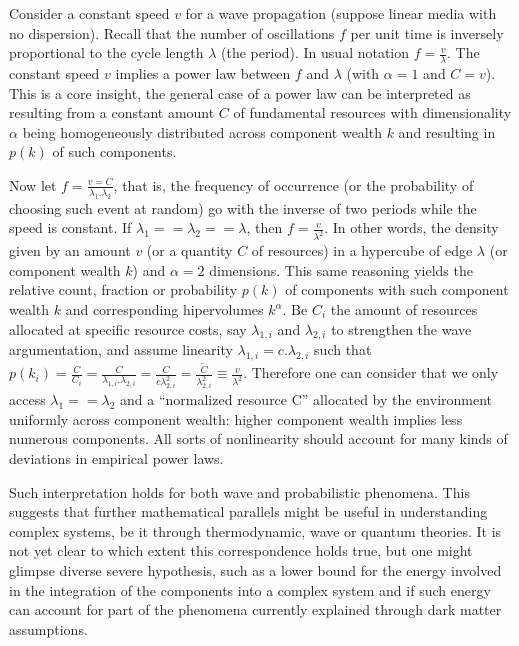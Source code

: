 \documentclass[a4paper, 11pt]{article} %
\begin{document}
Consider a constant speed $v$ for a wave propagation
(suppose linear media with no dispersion).
Recall that the number of oscillations $f$ per unit time is
inversely proportional to the cycle length $\lambda$ (the period).
In usual notation $f=\frac{v}{\lambda}$.
The constant speed $v$ implies a power law between 
$f$ and $\lambda$ (with $\alpha=1$ and $C=v$).
This is a core insight, the general case of a power law can
be interpreted as resulting from a constant amount $C$ of
fundamental resources with dimensionality $\alpha$ 
being homogeneously distributed across
component wealth $k$ and 
resulting in $p(k)$ of such components.

Now let $f=\frac{v=C}{\lambda_1 . \lambda_2}$, that is,
the frequency of occurrence
(or the probability of choosing such event at random) go with the inverse of two periods while the speed is constant. 
If $\lambda_1==\lambda_2==\lambda$, then $f=\frac{v}{\lambda^2}$.
In other words, the density given by an amount $v$
(or a quantity $C$ of resources) in a hypercube of
edge $\lambda$ (or component wealth $k$)
and $\alpha=2$ dimensions.
This same reasoning yields the relative count,
fraction or probability $p(k)$
of components with such component wealth $k$ and corresponding hipervolumes $k^\alpha$.
Be $C_i$ the amount of resources allocated at
specific resource costs,
say $\lambda_{1,i}$ and $\lambda_{2,i}$ to strengthen the wave argumentation,
and assume linearity $\lambda_{1,i}=c.\lambda_{2,i}$
such that
$p(k_i)=\frac{C}{C_i}=\frac{C}{\lambda_{1,i}.\lambda_{2,i}}=
\frac{C}{c\lambda_{2,i}^2}=\frac{\widetilde{C}}{\lambda_{2,i}^2}\equiv\frac{v}{\lambda^2}$.
Therefore one can consider that we only access $\lambda_1==\lambda_2$ and a ``normalized resource C'' allocated by the environment uniformly across component wealth:
higher component wealth implies less numerous components. 
All sorts of nonlinearity should account
for many kinds of deviations in empirical power laws.

Such interpretation holds for 
both wave and probabilistic phenomena.
This suggests that further mathematical
parallels might be useful in understanding complex
systems, be it through thermodynamic, wave or quantum theories.
It is not yet clear to which extent this correspondence holds true,
but one might glimpse diverse severe hypothesis,
such as a lower bound for the energy involved in the integration of
the components into a complex system and
if such energy can account for part of the phenomena
currently explained through dark matter assumptions.
\end{document}
